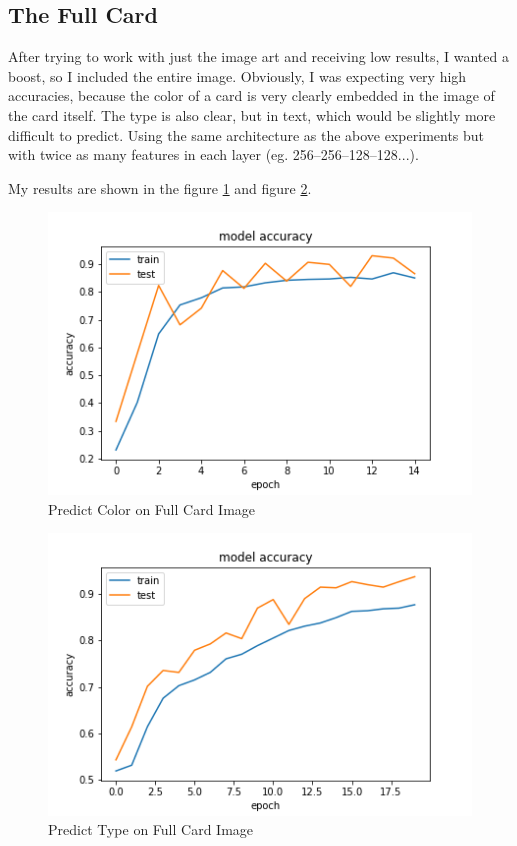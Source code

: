 \subsection{The Full Card}
After trying to work with just the image art and receiving
low results, I wanted a boost, so I included the entire image.
Obviously, I was expecting very high accuracies, because the 
color of a card is very clearly embedded in the image of the 
card itself. The type is also clear, but in text, which would 
be slightly more difficult to predict. Using the same 
architecture as the above experiments but with twice as many features
in each layer (eg. 256--256--128--128...).

My results are shown in the figure \ref{fig:full_color} and figure \ref{fig:full_type}.
\begin{figure}[h!]
    \centering
    \includegraphics[width=0.8\linewidth]{figures/full_color.png} 
    \caption{Predict Color on Full Card Image}
    \label{fig:full_color}
\end{figure}

\begin{figure}[h!]
    \centering
    \includegraphics[width=0.8\linewidth]{figures/full_type.png} 
    \caption{Predict Type on Full Card Image}
    \label{fig:full_type}
\end{figure}

